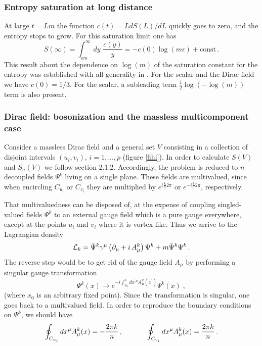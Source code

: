 \documentclass[11pt]{article}
\begin{document}
\subsubsection{Entropy saturation at long distance}
 At large $t=L m$ the function $c(t)=L d S(L)/dL$ quickly goes to zero, and the entropy stops to grow. For this saturation limit one has
\begin{equation}
S(\infty)=\int_{\epsilon m}^\infty dy \,\,\frac{c(y)}{y} =-c(0) \log(m \epsilon)+\textrm{const}\,.
\end{equation}
This result about the dependence on $\log (m)$ of the saturation constant for the entropy was established with all generality in \cite{cc}. For the scalar and the Dirac field we have $c(0)=1/3$. For the scalar, a subleading term $\frac{1}{2}\log(-\log(m))$ term is also present.



\subsubsection{Dirac field: bosonization and the massless multicomponent case}

Consider a massless Dirac field and a general set $V$ consisting in a collection of
disjoint intervals $ (u_{i},v_{i})$, $i=1,...,p$ (figure \ref{fihi}).
 In order to calculate $S(V)$ and $S_n(V)$ we follow section 2.1.2.  Accordingly, the problem is reduced to $n$ decoupled
fields $\Psi^{k}$ living on a single plane. These fields are multivalued,
since when encircling $C_{u_{i}}$ or $C_{v_{i}}$ they are multiplied
by $e^{i\frac{k}{n}2\pi }$ or $e^{-i\frac{k}{n}2\pi }$, respectively.

That multivaluedness can be disposed of, at the expense of
coupling singled-valued fields $\Psi^{k}$ to an external gauge
field which is a pure gauge everywhere, except at the points $u_{i}$ and
$v_{i}$ where it is vortex-like. Thus we arrive to the Lagrangian density
\begin{equation}
{\cal L}_{k}=\bar{\Psi}^{k}\gamma ^{\mu }\left( \partial _{\mu }+i\,A_{\mu
}^{k}\right) \Psi ^{k}+m\bar{\Psi}^{k}\Psi ^{k}\,.
\end{equation}
The reverse step would be to get rid of the gauge field $A_{\mu }$
by performing a singular gauge transformation 
\begin{equation}
\Psi^{k}(x)\to e^{-i\int_{x_{0}}^{x}dx^{^{\prime }\mu }A_{\mu }^{k}(x^{^{\prime }})}\Psi
^{k}\left( x\right) \;,
\end{equation}
(where $x_{0}$ is an arbitrary fixed point). Since the transformation
is singular, one goes back to a multivalued field. In order to reproduce the boundary conditions on $\Psi^{k}$,
we should have 
\begin{equation}
\oint_{C_{u_{i}}}dx^{\mu }A_{\mu }^{k}(x) =-\frac{2 \pi k}{n} \,,  
\hspace{1.2cm}
\oint_{C_{v_{i}}}dx^{\mu }A_{\mu }^{k}(x) =\frac{2 \pi k}{n} \,.
\label{90}
\end{equation}
\end{document}
